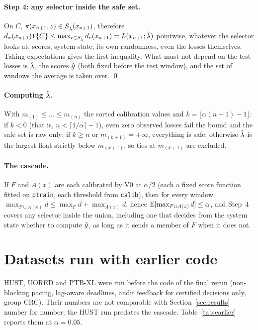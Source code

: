 \paragraph{Step 4: any selector inside the safe set.} On $C$, $\pi(x_{n+1},z) \in
S_{\hat\lambda}(x_{n+1})$, therefore $d_\pi(x_{n+1})\mathbf{1}\{C\} \le \max_{r\in S_{\hat\lambda}} d_r(x_{n+1}) =
L(x_{n+1};\hat\lambda)$ pointwise, whatever the selector looks at: scores, system state, its own
randomness, even the losses themselves. Taking expectations gives the first inequality. What must
not depend on the test losses is $\hat\lambda$, the scores $\hat g$ (both fixed before the test window), and
the set of windows the average is taken over. \qed

\paragraph{Computing $\hat\lambda$.} With $m_{(1)} \le \dots \le m_{(n)}$ the sorted calibration values and
$k = \lfloor \alpha(n+1) - 1\rfloor$: if $k < 0$ (that is, $n < \lceil 1/\alpha\rceil - 1$), even
zero observed losses fail the bound and the safe set is raw only; if $k \ge n$ or $m_{(k+1)} =
+\infty$, everything is safe; otherwise $\hat\lambda$ is the largest float strictly below $m_{(k+1)}$, so
ties at $m_{(k+1)}$ are excluded.

\paragraph{The cascade.} If $F$ and $A(x)$ are each calibrated by V0 at $\alpha/2$ (each a fixed
score function fitted on \texttt{ptrain}, each threshold from \texttt{calib}), then for every window
$\max_{F\cup A(x)} d \le \max_F d + \max_{A(x)} d$, hence $\mathbb{E}[\max_{F\cup A(x)} d] \le \alpha$, and
Step~4 covers any selector inside the union, including one that decides from the system state
whether to compute $\hat g$, as long as it sends a member of $F$ when it does not.

\section{Datasets run with earlier code}
\label{app:earlier}

HUST, UORED and PTB-XL were run before the code of the final rerun (non-blocking pacing,
lag-aware deadlines, audit feedback for certified decisions only, group CRC). Their numbers are
not comparable with Section~\ref{sec:results} number for number; the HUST run predates the
cascade. Table~\ref{tab:earlier} reports them at $\alpha = 0.05$.

